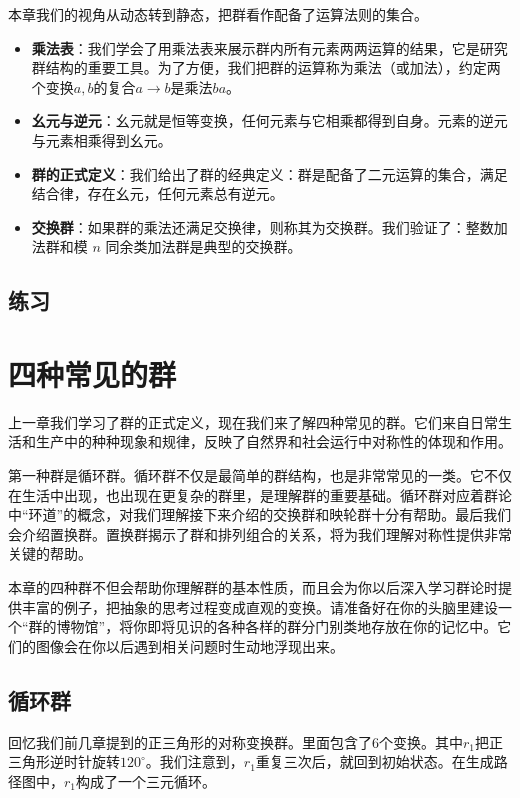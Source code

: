 \documentclass[12pt,UTF8,fontset=none]{ctexbook}
\begin{document}
本章我们的视角从动态转到静态，把群看作配备了运算法则的集合。
\begin{itemize}
    \item \textbf{乘法表}：我们学会了用乘法表来展示群内所有元素两两运算的结果，它是研究群结构的重要工具。为了方便，我们把群的运算称为乘法（或加法），约定两个变换$a,b$的复合$a\rightarrow b$是乘法$ba$。
    \item \textbf{幺元与逆元}：幺元就是恒等变换，任何元素与它相乘都得到自身。元素的逆元与元素相乘得到幺元。
    \item \textbf{群的正式定义}：我们给出了群的经典定义：群是配备了二元运算的集合，满足结合律，存在幺元，任何元素总有逆元。
    \item \textbf{交换群}：如果群的乘法还满足交换律，则称其为交换群。我们验证了：整数加法群和模 $n$ 同余类加法群是典型的交换群。
\end{itemize}

\clearpage
\section{练习}

\chapter{四种常见的群}

上一章我们学习了群的正式定义，现在我们来了解四种常见的群。它们来自日常生活和生产中的种种现象和规律，反映了自然界和社会运行中对称性的体现和作用。

第一种群是循环群。循环群不仅是最简单的群结构，也是非常常见的一类。它不仅在生活中出现，也出现在更复杂的群里，是理解群的重要基础。循环群对应着群论中“环道”的概念，对我们理解接下来介绍的交换群和映轮群十分有帮助。最后我们会介绍置换群。置换群揭示了群和排列组合的关系，将为我们理解对称性提供非常关键的帮助。

本章的四种群不但会帮助你理解群的基本性质，而且会为你以后深入学习群论时提供丰富的例子，把抽象的思考过程变成直观的变换。请准备好在你的头脑里建设一个“群的博物馆”，将你即将见识的各种各样的群分门别类地存放在你的记忆中。它们的图像会在你以后遇到相关问题时生动地浮现出来。

\section{循环群}

回忆我们前几章提到的正三角形的对称变换群。里面包含了$6$个变换。其中$r_1$把正三角形逆时针旋转$120^\circ$。我们注意到，$r_1$重复三次后，就回到初始状态。在生成路径图中，$r_1$构成了一个三元循环。
\end{document}
